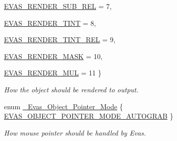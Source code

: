 \begin{DoxyCompactItemize}
\par
\hyperlink{group__Evas__Object__Group__Extras_gga551375283a5e2b0abffd5f40582e9ce2ab6167dbd8428b155181368f3d0eb349c}{EVAS\_\-RENDER\_\-SUB\_\-REL} =  7, 
\par
\hyperlink{group__Evas__Object__Group__Extras_gga551375283a5e2b0abffd5f40582e9ce2a9d1d18d6f8e8497db805b3539ff4a2e9}{EVAS\_\-RENDER\_\-TINT} =  8, 
\par
\hyperlink{group__Evas__Object__Group__Extras_gga551375283a5e2b0abffd5f40582e9ce2a074b198fc95213003d51be4e1b2988c6}{EVAS\_\-RENDER\_\-TINT\_\-REL} =  9, 
\par
\hyperlink{group__Evas__Object__Group__Extras_gga551375283a5e2b0abffd5f40582e9ce2ad84a48299047fa2e2fb0d9807cae9b2f}{EVAS\_\-RENDER\_\-MASK} =  10, 
\par
\hyperlink{group__Evas__Object__Group__Extras_gga551375283a5e2b0abffd5f40582e9ce2a9da04ad7efd34522071e86a01a57f294}{EVAS\_\-RENDER\_\-MUL} =  11
 \}
\begin{DoxyCompactList}\small\item\em How the object should be rendered to output. \item\end{DoxyCompactList}\item 
enum \hyperlink{group__Evas__Object__Group__Extras_ga822b2a69896ff21279debe2a417e3082}{\_\-Evas\_\-Object\_\-Pointer\_\-Mode} \{ \hyperlink{group__Evas__Object__Group__Extras_gga822b2a69896ff21279debe2a417e3082a088ef2950aeb5a105c53decbbac82a28}{EVAS\_\-OBJECT\_\-POINTER\_\-MODE\_\-AUTOGRAB}
 \}
\begin{DoxyCompactList}\small\item\em How mouse pointer should be handled by Evas. \item\end{DoxyCompactList}\end{DoxyCompactItemize}
